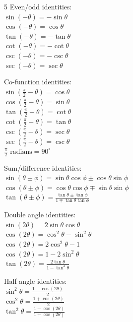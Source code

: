 \documentclass[10pt,landscape,a4paper]{article}
\begin{document}
\begin{multicols*}{5}
  Even/odd identities: \\
  \(\sin(- \theta) = - \sin \theta\) \\
  \(\cos (- \theta) = \cos \theta\) \\
  \(\tan(- \theta) = - \tan \theta\) \\
  \(\cot (- \theta) = - \cot \theta\) \\
  \(\csc(- \theta) = - \csc \theta\) \\
  \(\sec (- \theta) = \sec \theta\)

  Co-function identities: \\
  \(\sin \left(\frac{\pi}{2} - \theta \right) = \cos \theta\) \\
  \(\cos \left(\frac{\pi}{2} - \theta\right) = \sin \theta \) \\
  \(\tan \left(\frac{\pi}{2} - \theta \right) = \cot \theta\) \\
  \(\cot \left(\frac{\pi}{2} - \theta\right) = \tan \theta \) \\
  \(\csc \left(\frac{\pi}{2} - \theta \right) = \sec \theta\) \\
  \(\sec \left(\frac{\pi}{2} - \theta\right) = \csc \theta \) \\
  \(\frac{\pi}{2} \text{ radians} = 90^{\circ}\)

  Sum/difference identities: \\
  \(\sin (\theta \pm \phi) = \sin \theta \cos \phi \pm \cos \theta \sin \phi\) \\
  \(\cos (\theta \pm \phi) = \cos \theta \cos \phi \mp \sin \theta \sin \phi\) \\
  \(\tan (\theta \pm \phi) = \frac{\tan \theta \pm \tan \phi}{1 \mp \tan \theta \tan \phi}\)

  Double angle identities: \\
  \(\sin (2 \theta) = 2 \sin \theta \cos \theta\) \\
  \(\cos (2 \theta) = \cos^2 \theta - \sin^2 \theta\) \\
  \(\cos (2 \theta) = 2 \cos^2 \theta - 1\) \\
  \(\cos (2 \theta) = 1 - 2 \sin^2 \theta\) \\
  \(\tan (2 \theta) = \frac{2 \tan \theta}{1 - \tan^2 \theta}\)

  Half angle identities: \\
  \(\sin^2 \theta = \frac{1 - \cos (2 \theta)}{2}\) \\
  \(\cos^2 \theta = \frac{1 + \cos (2 \theta)}{2}\) \\
  \(\tan^2 \theta = \frac{1 - \cos (2 \theta)}{1 + \cos (2 \theta)}\)


\end{multicols*}
\end{document}
